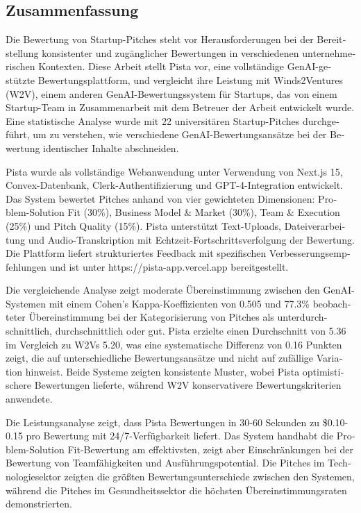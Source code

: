 \begin{otherlanguage}{ngerman}
\chapter*{Zusammenfassung}

Die Bewertung von Startup-Pitches steht vor Herausforderungen bei der Bereitstellung konsistenter und zugänglicher Bewertungen in verschiedenen unternehmerischen Kontexten. Diese Arbeit stellt Pista vor, eine vollständige GenAI-gestützte Bewertungsplattform, und vergleicht ihre Leistung mit Winds2Ventures (W2V), einem anderen GenAI-Bewertungssystem für Startups, das von einem Startup-Team in Zusammenarbeit mit dem Betreuer der Arbeit entwickelt wurde. Eine statistische Analyse wurde mit 22 universitären Startup-Pitches durchgeführt, um zu verstehen, wie verschiedene GenAI-Bewertungsansätze bei der Bewertung identischer Inhalte abschneiden.

Pista wurde als vollständige Webanwendung unter Verwendung von Next.js 15, Convex-Datenbank, Clerk-Authentifizierung und GPT-4-Integration entwickelt. Das System bewertet Pitches anhand von vier gewichteten Dimensionen: Problem-Solution Fit (30\%), Business Model \& Market (30\%), Team \& Execution (25\%) und Pitch Quality (15\%). Pista unterstützt Text-Uploads, Dateiverarbeitung und Audio-Transkription mit Echtzeit-Fortschrittsverfolgung der Bewertung. Die Plattform liefert strukturiertes Feedback mit spezifischen Verbesserungsempfehlungen und ist unter https://pista-app.vercel.app bereitgestellt.

Die vergleichende Analyse zeigt moderate Übereinstimmung zwischen den GenAI-Systemen mit einem Cohen's Kappa-Koeffizienten von 0.505 und 77.3\% beobachteter Übereinstimmung bei der Kategorisierung von Pitches als unterdurchschnittlich, durchschnittlich oder gut. Pista erzielte einen Durchschnitt von 5.36 im Vergleich zu W2Vs 5.20, was eine systematische Differenz von 0.16 Punkten zeigt, die auf unterschiedliche Bewertungsansätze und nicht auf zufällige Variation hinweist. Beide Systeme zeigten konsistente Muster, wobei Pista optimistischere Bewertungen lieferte, während W2V konservativere Bewertungskriterien anwendete.

Die Leistungsanalyse zeigt, dass Pista Bewertungen in 30-60 Sekunden zu \$0.10-0.15 pro Bewertung mit 24/7-Verfügbarkeit liefert. Das System handhabt die Problem-Solution Fit-Bewertung am effektivsten, zeigt aber Einschränkungen bei der Bewertung von Teamfähigkeiten und Ausführungspotential. Die Pitches im Technologiesektor zeigten die größten Bewertungsunterschiede zwischen den Systemen, während die Pitches im Gesundheitssektor die höchsten Übereinstimmungsraten demonstrierten.


\end{otherlanguage}
